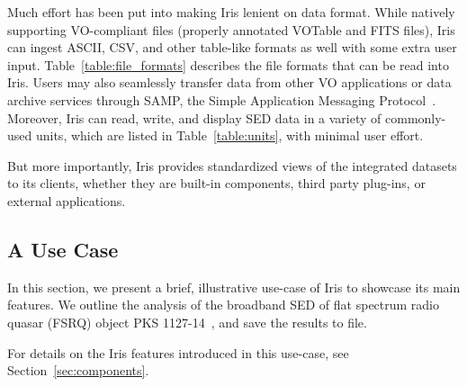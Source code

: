 \documentclass[preprint,authoryear,5p]{elsarticle}
\begin{document}
\begin{sloppypar}
Much effort has been put into making Iris lenient on data format. While natively
supporting VO-compliant files (properly annotated
VOTable and FITS files), Iris can ingest ASCII, CSV,
and other table-like formats as well with some extra user input.
Table~\ref{table:file_formats}
describes the file formats that can be read into Iris. Users may also
seamlessly transfer data from other VO applications or data archive services
through SAMP, the Simple Application Messaging
Protocol~\citep{2011arXiv1110.0528T}. Moreover, Iris can read, write, and display SED data in
a variety of commonly-used units, which are listed in Table~\ref{table:units}, with minimal user effort.

\end{sloppypar}

But more importantly, Iris provides standardized views of the integrated
datasets to its clients, whether they are built-in components, third party
plug-ins, or external applications.

\subsection{A Use Case} \label{subsec:usecase}

In this section, we present a brief, illustrative use-case
of Iris to showcase its main features. We outline the analysis of the broadband SED
of flat spectrum radio quasar (FSRQ) object PKS 1127-14~\citep[see][]{2004ApJ...600L..27B}, and save the
results to file.

For details on the Iris features introduced in this use-case, see Section~\ref{sec:components}.
\end{document}
